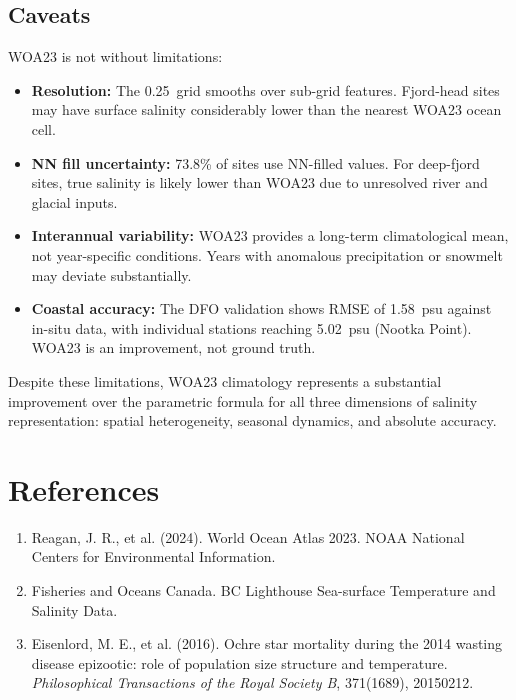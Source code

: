 \documentclass[11pt,a4paper]{article}
\begin{document}
\subsection{Caveats}

WOA23 is not without limitations:
\begin{itemize}
    \item \textbf{Resolution:} The 0.25\textdegree\ grid smooths over sub-grid
    features. Fjord-head sites may have surface salinity considerably lower than
    the nearest WOA23 ocean cell.
    \item \textbf{NN fill uncertainty:} 73.8\% of sites use NN-filled values.
    For deep-fjord sites, true salinity is likely lower than WOA23 due to
    unresolved river and glacial inputs.
    \item \textbf{Interannual variability:} WOA23 provides a long-term
    climatological mean, not year-specific conditions. Years with anomalous
    precipitation or snowmelt may deviate substantially.
    \item \textbf{Coastal accuracy:} The DFO validation shows RMSE of 1.58~psu
    against in-situ data, with individual stations reaching 5.02~psu (Nootka
    Point). WOA23 is an improvement, not ground truth.
\end{itemize}

Despite these limitations, WOA23 climatology represents a substantial
improvement over the parametric formula for all three dimensions of salinity
representation: spatial heterogeneity, seasonal dynamics, and absolute accuracy.

\section*{References}

\begin{enumerate}
    \item Reagan, J. R., et al. (2024). World Ocean Atlas 2023.
    NOAA National Centers for Environmental Information.
    \item Fisheries and Oceans Canada. BC Lighthouse Sea-surface
    Temperature and Salinity Data.
    \item Eisenlord, M. E., et al. (2016). Ochre star mortality during the
    2014 wasting disease epizootic: role of population size structure and
    temperature. \textit{Philosophical Transactions of the Royal Society B},
    371(1689), 20150212.
\end{enumerate}
\end{document}
